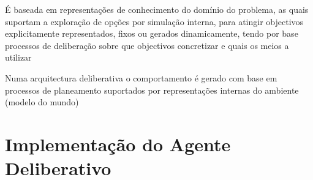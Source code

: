 É baseada em representações de conhecimento do domínio do problema, as quais
suportam a exploração de opções por simulação interna, para atingir objectivos
explicitamente representados, fixos ou gerados dinamicamente, tendo por base
processos de deliberação sobre que objectivos concretizar e quais os meios a utilizar

Numa arquitectura deliberativa o comportamento é gerado com base
em processos de planeamento suportados por representações internas
do ambiente (modelo do mundo)


\section{Implementação do Agente Deliberativo}\label{sec:implementacao-agente-deliberativo}
